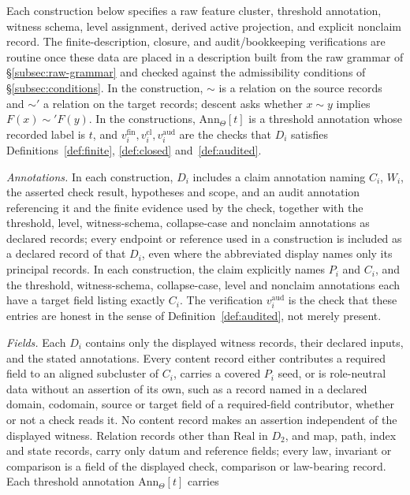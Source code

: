 Each construction below specifies a raw feature cluster, threshold
annotation, witness schema, level assignment, derived active
projection, and explicit nonclaim record. The finite-description,
closure, and audit/bookkeeping verifications are routine once these
data are placed in a description built from the raw grammar of
\S\ref{subsec:raw-grammar} and checked against the admissibility
conditions of \S\ref{subsec:conditions}. In the \Pone{} construction,
\(\sim\) is a relation on the source records and \(\sim'\) a relation on
the target records; descent asks whether \(x\sim y\) implies
\(F(x)\sim' F(y)\). In the constructions, \(\mathrm{Ann}_\Theta[t]\) is a
threshold annotation whose recorded label is \(t\), and
\(v_i^{\mathrm{fin}}, v_i^{\mathrm{cl}}, v_i^{\mathrm{aud}}\) are the checks
that \(D_i\) satisfies Definitions~\ref{def:finite}, \ref{def:closed}
and~\ref{def:audited}. \par\emph{Annotations.} In each construction, \(D_i\) includes a claim
annotation naming \(C_i\), \(W_i\), the asserted check result, hypotheses and
scope, and an audit annotation referencing it and the finite evidence used by
the check, together with the threshold, level, witness-schema, collapse-case
and nonclaim annotations as declared records; every endpoint or reference used in a
construction is included as a declared record of that \(D_i\), even where the
abbreviated display names only its principal records. In each construction,
the claim explicitly names \(P_i\) and \(C_i\), and the threshold,
witness-schema, collapse-case, level and nonclaim annotations each have a
target field listing exactly \(C_i\). The verification \(v_i^{\mathrm{aud}}\) is the check that
these entries are honest in the sense of Definition~\ref{def:audited}, not
merely present. \par\emph{Fields.} Each \(D_i\) contains only the displayed witness records, their declared
inputs, and the stated annotations. Every content record either contributes a
required field to an aligned subcluster of \(C_i\), carries a covered \(P_i\)
seed, or is role-neutral data without an assertion of its own, such as a record named
in a declared domain, codomain, source or target field of a required-field
contributor, whether or not a check reads it. No content record
makes an assertion independent of the displayed witness. Relation records
other than \(\mathrm{Real}\) in \(D_2\), and map, path, index and state
records, carry only datum and reference fields; every law,
invariant or comparison is a field of the displayed check, comparison or
law-bearing record. Each threshold annotation \(\mathrm{Ann}_\Theta[t]\) carries
